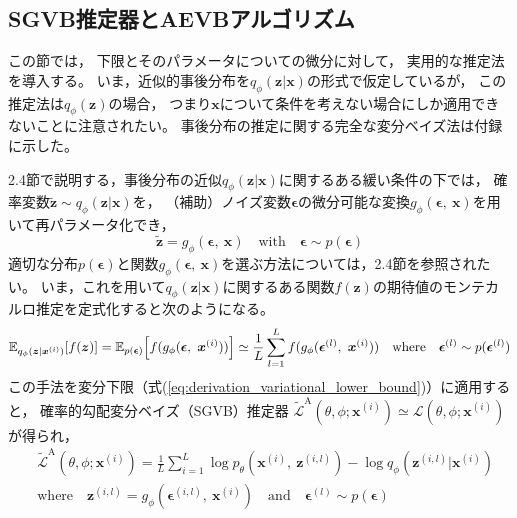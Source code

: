 \documentclass[dvipdfmx, fleqn, draft]{jsarticle}
\begin{document}
\subsection{SGVB推定器とAEVBアルゴリズム}

この節では，
下限とそのパラメータについての微分に対して，
実用的な推定法を導入する。
いま，近似的事後分布を\(q_{\phi} (\bm{z} | \bm{x})\)の形式で仮定しているが，
この推定法は\(q_{\phi} (\bm{z})\)の場合，
つまり\(\bm{x}\)について条件を考えない場合にしか適用できないことに注意されたい。
事後分布の推定に関する完全な変分ベイズ法は付録に示した。

2.4節で説明する，事後分布の近似\(q_{\phi} (\bm{z} | \bm{x})\)に関するある緩い条件の下では，
確率変数\(\tilde{\bm{z}} \sim q_{\phi} (\bm{z} | \bm{x})\)を，
（補助）ノイズ変数\(\bm{\epsilon}\)の微分可能な変換\(g_{\phi} (\bm{\epsilon},\ \bm{x})\)を用いて再パラメータ化でき，
\begin{equation}
    \tilde{\bm{z}} = g_{\phi} (\bm{\epsilon},\ \bm{x})
        \quad \text{with} \quad
        \bm{\epsilon} \sim p(\bm{\epsilon})
    \label{eq:reparameterization}
\end{equation}
適切な分布\(p(\bm{\epsilon})\)と関数\(g_{\phi} (\bm{\epsilon},\ \bm{x})\)を選ぶ方法については，2.4節を参照されたい。
いま，これを用いて\(q_{\phi} (\bm{z} | \bm{x})\)に関するある関数\(f(\bm{z})\)の期待値のモンテカルロ推定を定式化すると次のようになる。
\begin{equation}
    \mathbb{E}_{q_{\phi} (\bm{z} | \bm{x}^{(i)})} \qty[f(\bm{z})]
        = \mathbb{E}_{p(\bm{\epsilon})} \qty[f(g_{\phi} (\bm{\epsilon},\ \bm{x}^{(i)}))]
        \simeq \frac{1}{L} \sum_{l=1}^{L} f(g_{\phi} (\bm{\epsilon}^{(l)},\ \bm{x}^{(i)}))
    \quad \text{where} \quad
    \bm{\epsilon}^{(l)} \sim p(\bm{\epsilon}^{(l)})
    \label{eq:expectation}
\end{equation}
この手法を変分下限（式(\ref{eq:derivation_variational_lower_bound})）に適用すると，
確率的勾配変分ベイズ（SGVB）推定器
\(\tilde{\mathcal{L}}^\mathrm{A} (\theta, \phi; \bm{x}^{(i)}) \simeq \mathcal{L} (\theta, \phi; \bm{x}^{(i)})\)が得られ，
\begin{equation}
    \begin{split}
    & \tilde{\mathcal{L}}^\mathrm{A} (\theta, \phi; \bm{x}^{(i)})
        = \frac{1}{L} \sum_{i=1}^{L} \log{p_{\theta} (\bm{x}^{(i)},\ \bm{z}^{(i, l)})} - \log{q_{\phi} (\bm{z}^{(i, l)} | \bm{x}^{(i)})} \\
    & \text{where} \quad
        \bm{z}^{(i, l)} = g_{\phi} (\bm{\epsilon}^{(i, l)},\ \bm{x}^{(i)})
        \quad \text{and} \quad
        \bm{\epsilon}^{(l)} \sim p(\bm{\epsilon})
    \end{split}
    \label{eq:SGVB_estimator_A}
\end{equation}
\end{document}
